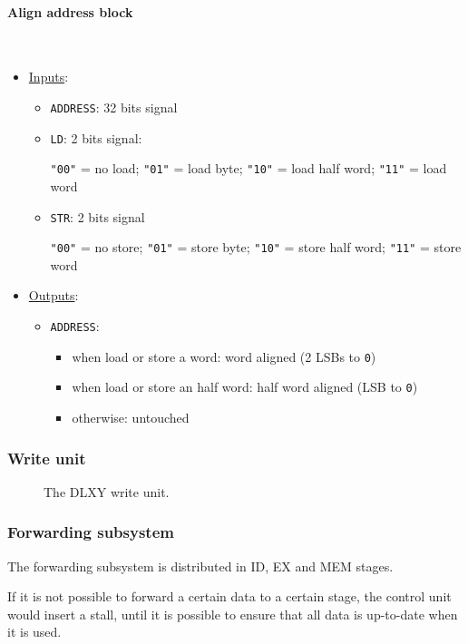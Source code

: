 \paragraph{Align address block} \mbox{} \\
\begin{itemize}
	\item \underline{Inputs}:
		\begin{itemize}
			\item \texttt{ADDRESS}: 32 bits signal
			\item \texttt{LD}: 2 bits signal:

				\texttt{"00"} = no load; \texttt{"01"} = load byte;
				\texttt{"10"} = load half word; \texttt{"11"} = load word
			\item \texttt{STR}: 2 bits signal

				\texttt{"00"} = no store; \texttt{"01"} = store byte;
				\texttt{"10"} = store half word; \texttt{"11"} = store word
		\end{itemize}
	\item \underline{Outputs}:
		\begin{itemize}
			\item \texttt{ADDRESS}:
				\begin{itemize}
					\item when load or store a word: word aligned (2 LSBs to \texttt{0})
					\item when load or store an half word: half word aligned (LSB to \texttt{0})
					\item otherwise: untouched
				\end{itemize}
		\end{itemize}
\end{itemize}

\subsubsection{Write unit}
\begin{figure}[H]
	\centering
	\caption{The DLXY write unit.}
	\label{fig:write_unit}
\end{figure}

\subsubsection{Forwarding subsystem}
The forwarding subsystem is distributed in ID, EX and MEM stages.

If it is not possible to forward a certain data to a certain stage, the control
unit would insert a stall, until it is possible to ensure that all data is
up-to-date when it is used.

